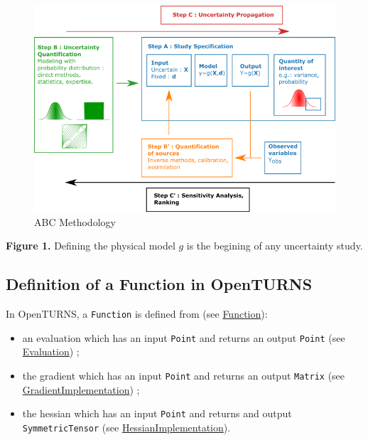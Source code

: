 \documentclass[11pt]{article}
\begin{document}
\begin{figure}
\centering
\includegraphics{MethodologieIncertitude-EN_arial.png}
\caption{ABC Methodology}
\end{figure}

\textbf{Figure 1.} Defining the physical model \(g\) is the begining of
any uncertainty study.

    \hypertarget{definition-of-a-function-in-openturns}{%
\subsection{Definition of a Function in
OpenTURNS}\label{definition-of-a-function-in-openturns}}

In OpenTURNS, a \texttt{Function} is defined from
(see \href{https://github.com/openturns/openturns/blob/18146c0a82819c3f8d8e691a119a93c155429422/lib/src/Base/Func/openturns/Function.hxx\#L74}{Function}):

\begin{itemize}
\item an evaluation which has an input \texttt{Point} and returns an output
\texttt{Point} (see
\href{https://github.com/openturns/openturns/blob/18146c0a82819c3f8d8e691a119a93c155429422/lib/src/Base/Func/openturns/Evaluation.hxx\#L83}{Evaluation})
;
\item the gradient which has an input \texttt{Point} and returns an output
\texttt{Matrix} (see
\href{https://github.com/openturns/openturns/blob/18146c0a82819c3f8d8e691a119a93c155429422/lib/src/Base/Func/openturns/GradientImplementation.hxx\#L82}{GradientImplementation})
;
\item the hessian which has an input \texttt{Point} and returns and output
\texttt{SymmetricTensor} (see
\href{https://github.com/openturns/openturns/blob/18146c0a82819c3f8d8e691a119a93c155429422/lib/src/Base/Func/openturns/HessianImplementation.hxx\#L79}{HessianImplementation}).
\end{itemize}
\end{document}
